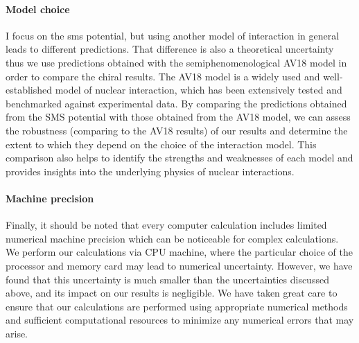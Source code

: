     \paragraph{Model choice}
    I focus on the \gls{sms} potential, but using another model of interaction 
    in general leads to different predictions. That difference is also a theoretical uncertainty thus
    we use predictions obtained with the semiphenomenological AV18 model in order to compare the chiral results.
    The AV18 model is a widely used and well-established model of nuclear interaction,
    which has been extensively tested and benchmarked against experimental data. By comparing
    the predictions obtained from the SMS potential with those obtained from the AV18 model,
    we can assess the robustness (comparing to  the AV18 results) of our results and determine the extent to which they depend
    on the choice of the interaction model. This comparison also helps to identify the strengths
    and weaknesses of each model and provides insights into the underlying physics of nuclear interactions.

    \paragraph{Machine precision}

    Finally, it should be noted that every computer calculation includes limited numerical machine precision which
    can be noticeable for complex calculations. We perform our calculations via CPU machine, where the particular
    choice of the processor and memory card may lead to numerical uncertainty. However, we have found that this
    uncertainty is much smaller than the uncertainties discussed above, and its impact on our results is
    negligible. We have taken great care to ensure that our calculations are performed using appropriate numerical
    methods and sufficient computational resources to minimize any numerical errors that may arise. 
